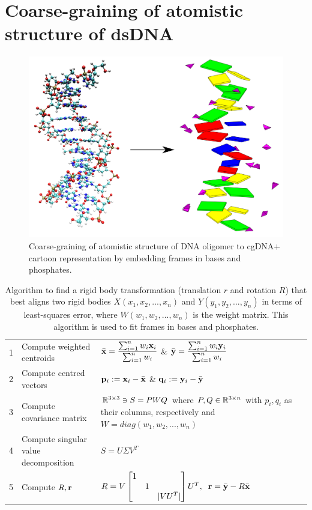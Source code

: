 \section{Coarse-graining of atomistic structure of dsDNA}\label{c2:sec1}
\begin{figure}[htb]
	\begin{center}
	\centering\includegraphics[scale=0.2]{images/drew_atom.png}
	\centering\caption{Coarse-graining of atomistic structure of DNA oligomer to cgDNA$+$ cartoon representation by embedding frames in bases and phosphates. }
\label{c2:fig1}
\end{center}
\end{figure}
\begin{table}
\begin{tabular}{ m{0.2cm} | m{6.4cm} | m{6.8cm} }
1  & Compute weighted centroids & $\bar{\mathbf{x}} = \dfrac{\sum_{i=1}^{n}w_i \mathbf{x}_i }{\sum_{i=1}^{n} w_i }$ \&  $\bar{\mathbf{y}} = \dfrac{\sum_{i=1}^{n}w_i \mathbf{y}_i }{\sum_{i=1}^{n} w_i }$  \\ [0.7cm]
2 & Compute centred vectors     & $\mathbf{p}_i := \mathbf{x}_i - \bar{\mathbf{x}}$ \&   $\mathbf{q}_i := \mathbf{y}_i - \bar{\mathbf{y}}$ \\  [0.5cm]
3 & Compute covariance matrix & ${\mathbb R}^{3 \times 3} \ni S = PWQ$ where $P,Q \in {\mathbb R}^{3 \times n}$  \linebreak with $p_i,q_i$ as their columns, respectively \linebreak and $W =  diag(w_1,w_2,...,w_n)$  \\
[0.8cm]
4 & Compute singular value decomposition & $S = U\Sigma V^T$\\ [0.2cm]
5 & Compute $R, \mathbf{r} $ &
 $R = V\begin{bmatrix}
   1 &  & \\
   & 1 &  \\
    & & |VU^T|
        \end{bmatrix} U^T, \;\;\mathbf{r} = \bar{\mathbf{y}} - R \bar{\mathbf{x}}$\\[.7cm]
\end{tabular}
\centering\caption{Algorithm to find a rigid body transformation (translation $r$ and rotation $R$) that best aligns two rigid bodies $X(x_1,x_2,...,x_n)$ and $Y(y_1,y_2,...,y_n)$ in terms of least-squares error, where $W (w_1,w_2,...,w_n)$ is the weight matrix.
This algorithm is used to fit frames in bases and phosphates.}
\label{c2:tab1}
\end{table}

